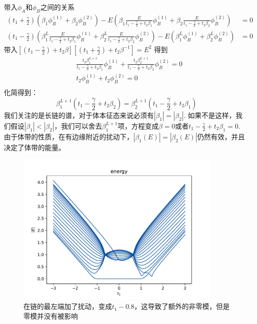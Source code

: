 \documentclass{article}
\begin{document}
带入$\phi_A$和$\phi_B$之间的关系
\begin{equation}
    \begin{split}
        \left(t_1+\frac{\gamma}{2}\right)\left(\beta_1\phi_B^{(1)}+\beta_2\phi_B^{(2)}\right)-E\left(\beta_1\frac{E}{t_1-\frac{\gamma}{2}+t_2\beta_1}\phi_B^{(1)}+\beta_2\frac{E}{t_1-\frac{\gamma}{2}+t_2\beta_2}\phi_B^{(2)}\right)&=0\\
        \left(t_1-\frac{\gamma}{2}\right)\left(\beta_1^L\frac{E}{t_1-\frac{\gamma}{2}+t_2\beta_1}\phi_B^{(1)}+\beta_2^L\frac{E}{t_1-\frac{\gamma}{2}+t_2\beta_2}\phi_B^{(2)}\right)-E\left(\beta_1^L\phi_B^{(1)}+\beta_2^L\phi_B^{(2)}\right)&=0
    \end{split}
\end{equation}
带入$\left[\left(t_1-\frac{\gamma}{2}\right)+t_2\beta\right]\left[\left(t_1+\frac{\gamma}{2}\right)+t_2\beta^{-1}\right]=E^2$
得到
\begin{equation}
    \begin{split}
        &\frac{t_2\beta_1^{L+1}}{t_1-\frac{\gamma}{2}+t_2\beta_1}\phi_B^{(1)}+\frac{t_2\beta_2^{L+1}}{t_1-\frac{\gamma}{2}+t_2\beta_2}\phi_B^{(2)}=0\\
        &t_2\phi_B^{(1)}+t_2\phi_B^{(2)}=0\\
    \end{split}
\end{equation}
化简得到：
\begin{equation}
    \beta_1^{L+1}(t_1-\frac{\gamma}{2}+t_2\beta_2)=\beta_2^{L+1}(t_1-\frac{\gamma}{2}+t_2\beta_1)
\end{equation}
我们关注的是长链的谱，对于体本征态来说必须有$|\beta_1|=|\beta_2|$. 如果不是这样，我们假设$|\beta_1|<|\beta_2|$，我们可以舍去$\beta_1^{L+1}$项，方程变成$\beta=0$或者$t_1-\frac{\gamma}{2}+t_2\beta_1=0$. 由于体带的性质，在有边缘附近的扰动下，$|\beta_1(E)|=|\beta_2(E)|$仍然有效，并且决定了体带的能量。
\begin{figure}[h]
    \centering
    \includegraphics[width=4in]{Figure_4.pdf}
    \caption{在链的最左端加了扰动，变成$t_1-0.8$，这导致了额外的非零模，但是零模并没有被影响}
\end{figure}
\end{document}
